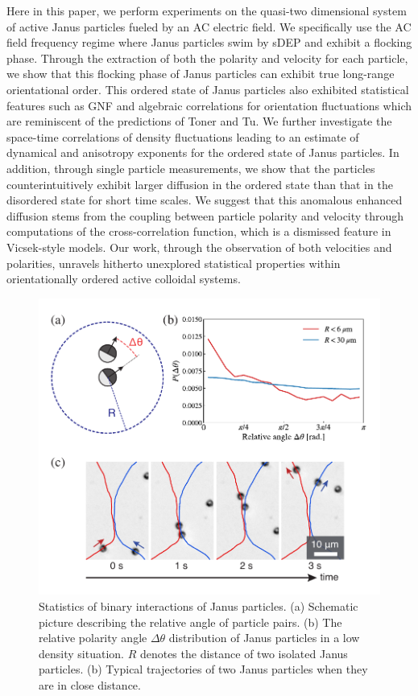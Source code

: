 \documentclass[%
 reprint,
 amsmath,amssymb,
 aps,
 floatfix
]{revtex4-2}
\begin{document}
Here in this paper, we perform experiments on the quasi-two dimensional system of active Janus particles fueled by an AC electric field. 
We specifically use the AC field frequency regime where Janus particles swim by sDEP and exhibit a flocking phase.
Through the extraction of both the polarity and velocity for each particle, we show that this flocking phase of Janus particles can exhibit true long-range orientational order.
This ordered state of Janus particles also exhibited statistical features such as GNF and algebraic correlations for orientation fluctuations which are reminiscent of the predictions of Toner and Tu.
We further investigate the space-time correlations of density fluctuations leading to an estimate of dynamical and anisotropy exponents for the ordered state of Janus particles.
In addition, through single particle measurements, we show that the particles counterintuitively exhibit larger diffusion in the ordered state than that in the disordered state for short time scales.
We suggest that this anomalous enhanced diffusion stems from the coupling between particle polarity and velocity through computations of the cross-correlation function, which is a dismissed feature in Vicsek-style models.
Our work, through the observation of both velocities and polarities, unravels hitherto unexplored statistical properties within orientationally ordered active colloidal systems.


\begin{figure}[bt]
\includegraphics[width=\columnwidth]{fig1.pdf}
\caption{\label{binary_int} Statistics of binary interactions of Janus particles. (a) Schematic picture describing the relative angle of particle pairs. (b) The relative polarity angle $\Delta \theta$ distribution of Janus particles in a low density situation. $R$ denotes the distance of two isolated Janus particles. (b) Typical trajectories of two Janus particles when they are in close distance. }
\end{figure} 
\end{document}
